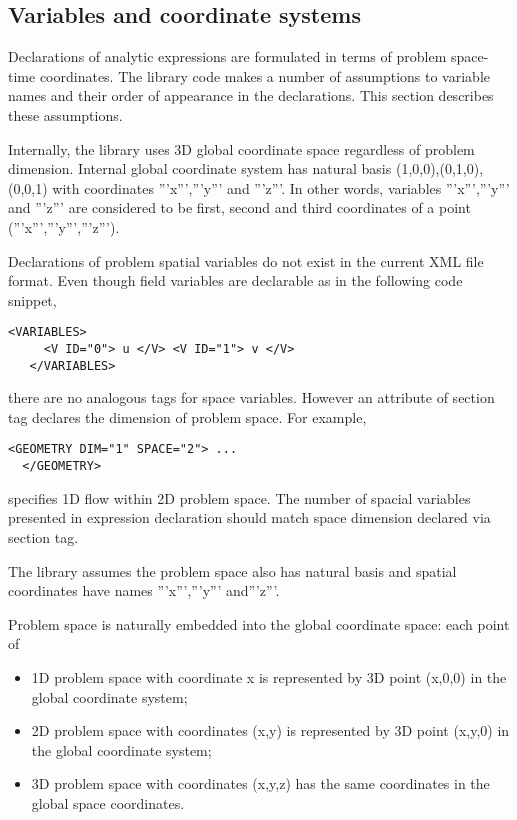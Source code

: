 \subsection{Variables and coordinate systems}
Declarations of analytic expressions are formulated in terms of problem
space-time coordinates. The library code makes a number of assumptions to
variable names and their order of appearance in the declarations. This section
describes these assumptions.

Internally, the library uses 3D global coordinate space regardless of problem
dimension. Internal global coordinate system has natural basis
{{{(1,0,0),(0,1,0),(0,0,1)}}} with coordinates '''x''','''y''' and '''z'''. In
other words, variables '''x''','''y''' and '''z''' are considered to be first,
second and third coordinates of a point ('''x''','''y''','''z''').

Declarations of problem spatial variables do not exist in the current XML file
format. Even though field variables are declarable as in the following code
snippet, 
\begin{lstlisting}[style=XMLStyle]
   <VARIABLES>
     <V ID="0"> u </V> <V ID="1"> v </V>
   </VARIABLES>
\end{lstlisting} 
there are no analogous tags for space variables. However an attribute
 of  section tag declares the dimension of
problem space. For example, \begin{lstlisting}[style=XMLStyle]
  <GEOMETRY DIM="1" SPACE="2"> ...
  </GEOMETRY>
\end{lstlisting}
specifies 1D flow within 2D problem space. The number of spacial variables
presented in expression declaration should match space dimension declared via
 section tag.

The library assumes the problem space also has natural basis and spatial
coordinates have names '''x''','''y''' and'''z'''.

Problem space is naturally embedded into the global coordinate space: each point
of
\begin{itemize}
\item 1D problem space with coordinate {{{x}}} is represented by 3D point
 {{{(x,0,0)}}} in the global coordinate system;
\item 2D problem space with coordinates {{{(x,y)}}} is represented by 3D point 
 {{{(x,y,0)}}} in the global coordinate system;
\item 3D problem space with coordinates {{{(x,y,z)}}} has the
 same coordinates in the global space coordinates.
\end{itemize}

